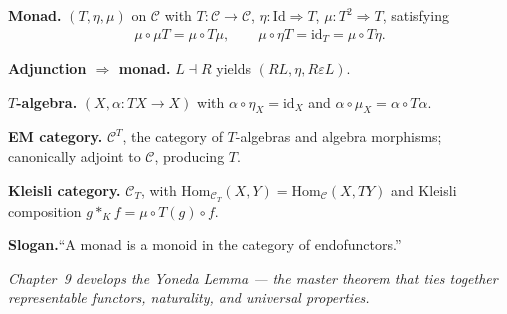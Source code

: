 \begin{formalrestatement}
\textbf{Monad.}\quad
$(T, \eta, \mu)$ on $\mathcal{C}$ with $T : \mathcal{C} \to \mathcal{C}$,
$\eta : \mathrm{Id} \Rightarrow T$, $\mu : T^2 \Rightarrow T$, satisfying
\begin{align*}
  \mu \circ \mu T = \mu \circ T \mu, \qquad
  \mu \circ \eta T = \mathrm{id}_T = \mu \circ T \eta.
\end{align*}

\medskip
\textbf{Adjunction $\Rightarrow$ monad.}\quad
$L \dashv R$ yields $(R L, \eta, R \varepsilon L)$.

\medskip
\textbf{$T$-algebra.}\quad
$(X, \alpha : T X \to X)$ with $\alpha \circ \eta_X = \mathrm{id}_X$ and
$\alpha \circ \mu_X = \alpha \circ T \alpha$.

\medskip
\textbf{EM category.}\quad
$\mathcal{C}^T$, the category of $T$-algebras and algebra morphisms;
canonically adjoint to $\mathcal{C}$, producing $T$.

\medskip
\textbf{Kleisli category.}\quad
$\mathcal{C}_T$, with $\mathrm{Hom}_{\mathcal{C}_T}(X, Y) = \mathrm{Hom}_\mathcal{C}(X, T Y)$
and Kleisli composition $g *_K f = \mu \circ T(g) \circ f$.

\medskip
\textbf{Slogan.}\quad ``A monad is a monoid in the category of endofunctors.''

\medskip
\noindent\textit{Chapter~9 develops the Yoneda Lemma --- the master
theorem that ties together representable functors, naturality, and
universal properties.}
\end{formalrestatement}
